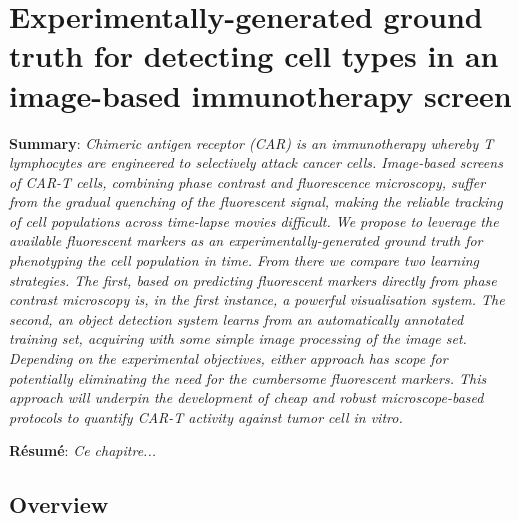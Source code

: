 
\chapter{Experimentally-generated ground truth for detecting cell types in an image-based immunotherapy screen} %

\label{Chapter5} %


\textbf{Summary}: \emph{Chimeric antigen receptor (CAR) is an immunotherapy whereby T lymphocytes are engineered to selectively attack cancer cells. Image-based screens of CAR-T cells, combining phase contrast and fluorescence microscopy, suffer from the gradual quenching of the fluorescent signal, making the reliable tracking of cell populations across time-lapse movies difficult. We propose to leverage the available fluorescent markers as an experimentally-generated ground truth for phenotyping the cell population in time. From there we compare two learning strategies. The first, based on predicting fluorescent markers directly from phase contrast microscopy is, in the first instance, a powerful visualisation system. The second, an object detection system learns from an automatically annotated training set, acquiring with some simple image processing of the image set. Depending on the experimental objectives, either approach has scope for potentially eliminating the need for the cumbersome fluorescent markers. This approach will underpin the development of cheap and robust microscope-based protocols to quantify CAR-T activity against tumor cell in vitro.}

\textbf{R\'esum\'e}: \emph{Ce chapitre...}

\section{Overview}

